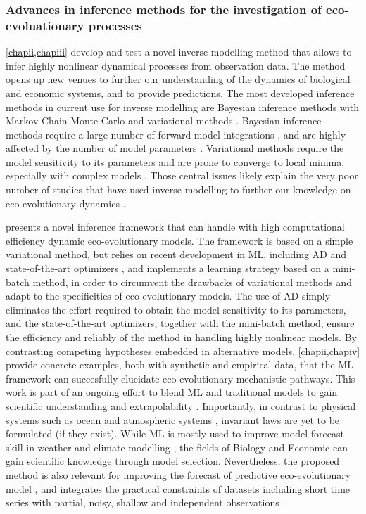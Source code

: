\subsubsection{Advances in inference methods for the investigation of eco-evoluationary processes}

\cref{chapii,chapiii} develop and test a novel inverse modelling method that allows to infer highly nonlinear dynamical processes from observation data. The method opens up new venues to further our understanding of the dynamics of biological and economic systems, and to provide predictions.
% 
The most developed inference methods in current use for inverse modelling are Bayesian inference methods with Markov Chain Monte Carlo \xxx and variational methods \xxx.
% 
% 
Bayesian inference methods require a large number of forward model integrations \cite{Schneider2017}, and are highly affected by the number of model parameters \cite{Csillery2010}.
% 
Variational methods require the model sensitivity to its parameters \xxx and are prone to converge to local minima, especially with complex models \cite{XXX}.
% 
Those central issues likely explain the very poor number of studies that have used inverse modelling to further our knowledge on eco-evolutionary dynamics \xxx. 
% 

%
\chapii presents a novel inference framework that can handle with high computational efficiency dynamic eco-evolutionary models.
% 
The framework is based on a simple variational method, but relies on recent development in ML, including AD \cite{Rackauckas2020a} and state-of-the-art optimizers \cite{Kingma2014}, and implements a learning strategy based on a mini-batch method, in order to circumvent the drawbacks of variational methods and adapt to the specificities of eco-evolutionary models. 
% 
The use of AD simply eliminates the effort required to obtain the model sensitivity to its parameters, and the state-of-the-art optimizers, together with the mini-batch method, ensure the efficiency and reliably of the method in handling highly nonlinear models.
% 
By contrasting competing hypotheses embedded in alternative models, \cref{chapii,chapiv} provide concrete examples, both with synthetic and empirical data, that the ML framework can succesfully elucidate eco-evolutionary mechanistic pathways.
% 
This work is part of an ongoing effort to blend ML and traditional models to gain scientific understanding and extrapolability \cite{XXX}. Importantly, in contrast to physical systems such as ocean and atmospheric systems \xxx, invariant laws are yet to be formulated (if they exist). While ML is mostly used to improve model forecast skill in weather and climate modelling \xxx, the fields of Biology and Economic can gain scientific knowledge through model selection. 
% 
Nevertheless, the proposed method is also relevant for improving the forecast of predictive eco-evolutionary model \cite{Urban2016}, and integrates the practical constraints of datasets including short time series with partial, noisy, shallow and independent observations \cite{Dornelas2018}.


